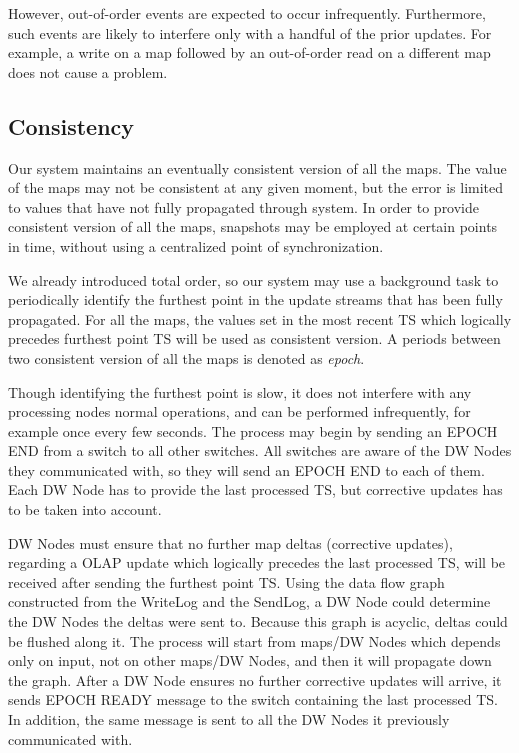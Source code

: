 \documentclass{sig-semester}
\def\OLAP{OLAP\xspace}
\begin{document}
However, out-of-order events are expected to occur infrequently. Furthermore, such events are likely to interfere only with a handful of the prior updates. For example, a write on a map followed by an out-of-order read on a different map does not cause a problem.

\subsection{Consistency}

Our system maintains an eventually consistent version of all the maps. The value of the maps may not be consistent at any given moment, but the error is limited to values that have not fully propagated through system. In order to provide consistent version of all the maps, snapshots may be employed at certain points in time, without using a centralized point of synchronization.

We already introduced total order, so our system may use a background task to periodically identify the furthest point in the update streams that has been fully propagated. For all the maps, the values set in the most recent TS which logically precedes furthest point TS will be used as consistent version. A periods between two consistent version of all the maps is denoted as \textit{epoch}.

Though identifying the furthest point is slow, it does not interfere with any processing nodes normal operations, and can be performed infrequently, for example once every few seconds. The process may begin by sending an EPOCH END from a switch to all other switches. All switches are aware of the DW Nodes they communicated with, so they will send an EPOCH END to each of them. Each DW Node has to provide the last processed TS, but corrective updates has to be taken into account. 

DW Nodes must ensure that no further map deltas (corrective updates), regarding a \OLAP update which logically precedes the last processed TS, will be received after sending the furthest point TS. Using the data flow graph constructed from the WriteLog and the SendLog, a DW Node could determine the DW Nodes the deltas were sent to. Because this graph is acyclic, deltas could be flushed along it. The process will start from maps/DW Nodes which depends only on input, not on other maps/DW Nodes, and then it will propagate down the graph. After a DW Node ensures no further corrective updates will arrive, it sends EPOCH READY message to the switch containing the last processed TS. In addition, the same message is sent to all the DW Nodes it previously communicated with.
\end{document}
